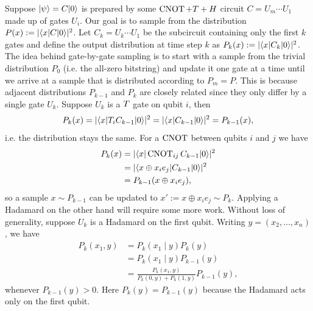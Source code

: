 Suppose $|\psi\rangle = C|0\rangle$ is prepared by some $\operatorname{CNOT}+T+H$ circuit $C = U_m \cdots U_1$ made up of gates $U_i$.
Our goal is to sample from the distribution $P(x) := |\langle x|C|0\rangle|^2$.
Let $C_k = U_k \cdots U_1$ be the subcircuit containing only the first $k$ gates and define the output distribution at time step $k$ as $P_k(x) := |\langle x|C_k|0\rangle|^2$.
The idea behind gate-by-gate sampling is to start with a sample from the trivial distribution $P_0$ (i.e. the all-zero bitstring) and update it one gate at a time until we arrive at a sample that is distributed according to $P_m = P$.
This is because adjacent distributions $P_{k-1}$ and $P_k$ are closely related since they only differ by a single gate $U_k$.
Suppose $U_k$ is a $T$ gate on qubit $i$, then
\[ P_k(x) = |\langle x|T_iC_{k-1}|0\rangle|^2 = |\langle x|C_{k-1}|0\rangle|^2 = P_{k-1}(x), \]
i.e. the distribution stays the same.
For a $\operatorname{CNOT}$ between qubits $i$ and $j$ we have
\begin{align}
    \begin{split}
        P_k(x) &= |\langle x|\operatorname{CNOT}_{ij}C_{k-1}|0\rangle|^2 \\
        &= |\langle x \oplus x_ie_j|C_{k-1}|0\rangle|^2 \\
        &= P_{k-1}(x \oplus x_ie_j),
    \end{split}
\end{align}
so a sample $x \sim P_{k-1}$ can be updated to $x' := x \oplus x_ie_j \sim P_k$.
Applying a Hadamard on the other hand will require some more work.
Without loss of generality, suppose $U_k$ is a Hadamard on the first qubit.
Writing $y=(x_2,\ldots,x_n)$, we have
\begin{align}
    P_k(x_1,y)
    &=P_k(x_1\mid y)P_k(y)\\
    &=P_k(x_1\mid y)P_{k-1}(y)\\
    &=\frac{P_k(x_1,y)}{P_k(0,y)+P_k(1,y)}P_{k-1}(y),
\end{align}
whenever $P_{k-1}(y)>0$.
Here $P_k(y)=P_{k-1}(y)$ because the Hadamard acts only on the first qubit.

